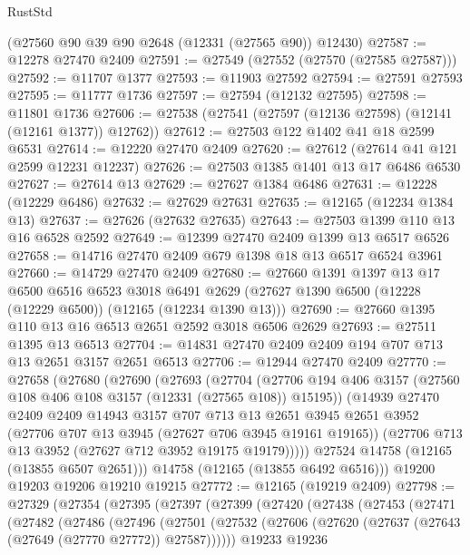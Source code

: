 \begin{lexlean}{RustStd}
\begin{coremodule}
    (@27560 @90 @39 @90 @2648 (@12331 (@27565 @90)) @12430)
@27587 := @12278 @27470 @2409
@27591 := @27549 (@27552 (@27570 (@27585 @27587)))
@27592 := @11707 @1377
@27593 := @11903 @27592
@27594 := @27591 @27593
@27595 := @11777 @1736
@27597 := @27594 (@12132 @27595)
@27598 := @11801 @1736
@27606 := @27538 (@27541 (@27597 (@12136 @27598) (@12141 (@12161 @1377)) @12762))
@27612 := @27503 @122 @1402 @41 @18 @2599 @6531
@27614 := @12220 @27470 @2409
@27620 := @27612 (@27614 @41 @121 @2599 @12231 @12237)
@27626 := @27503 @1385 @1401 @13 @17 @6486 @6530
@27627 := @27614 @13
@27629 := @27627 @1384 @6486
@27631 := @12228 (@12229 @6486)
@27632 := @27629 @27631
@27635 := @12165 (@12234 @1384 @13)
@27637 := @27626 (@27632 @27635)
@27643 := @27503 @1399 @110 @13 @16 @6528 @2592
@27649 := @12399 @27470 @2409 @1399 @13 @6517 @6526
@27658 := @14716 @27470 @2409 @679 @1398 @18 @13 @6517 @6524 @3961
@27660 := @14729 @27470 @2409
@27680 := @27660
    @1391
    @1397
    @13
    @17
    @6500
    @6516
    @6523
    @3018
    @6491
    @2629
    (@27627 @1390 @6500 (@12228 (@12229 @6500)) (@12165 (@12234 @1390 @13)))
@27690 := @27660 @1395 @110 @13 @16 @6513 @2651 @2592 @3018 @6506 @2629
@27693 := @27511 @1395 @13 @6513
@27704 := @14831 @27470 @2409 @2409 @194 @707 @713 @13 @2651 @3157 @2651 @6513
@27706 := @12944 @27470 @2409
@27770 := @27658
    (@27680
      (@27690
        (@27693
          (@27704
            (@27706 @194 @406 @3157 (@27560 @108 @406 @108 @3157 (@12331 (@27565 @108)) @15195))
            (@14939
              @27470
              @2409
              @2409
              @14943
              @3157
              @707
              @713
              @13
              @2651
              @3945
              @2651
              @3952
              (@27706 @707 @13 @3945 (@27627 @706 @3945 @19161 @19165))
              (@27706 @713 @13 @3952 (@27627 @712 @3952 @19175 @19179)))))
        @27524
        @14758
        (@12165 (@13855 @6507 @2651)))
      @14758
      (@12165 (@13855 @6492 @6516)))
    @19200
    @19203
    @19206
    @19210
    @19215
@27772 := @12165 (@19219 @2409)
@27798 := @27329
    (@27354
      (@27395
        (@27397
          (@27399
            (@27420
              (@27438
                (@27453
                  (@27471
                    (@27482
                      (@27486
                        (@27496
                          (@27501
                            (@27532
                              (@27606 (@27620 (@27637 (@27643 (@27649 (@27770 @27772)) @27587))))))
                          @19233
                          @19236

\end{coremodule}
\end{lexlean}
